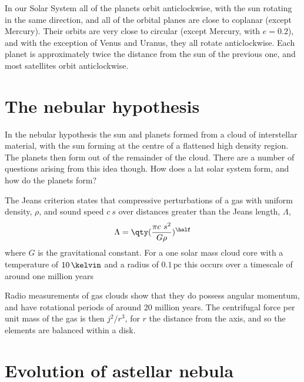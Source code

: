 In our Solar System all of the planets orbit anticlockwise, with the
sun rotating in the same direction, and all of the orbital planes are
close to coplanar (except Mercury). Their orbits are very close to
circular (except Mercury, with $e=0.2$), and with the exception of
Venus and Uranus, they all rotate anticlockwise. Each planet is
approximately twice the distance from the sun of the previous one, and
most satellites orbit anticlockwise.

\section{The nebular hypothesis}
\label{sec:nebular-hypothesis}

In the nebular hypothesis the sun and planets formed from a cloud of
interstellar material, with the sun forming at the centre of a
flattened high density region. The planets then form out of the
remainder of the cloud. There are a number of questions arising from
this idea though. How does a lat solar system form, and how do the
planets form?

The Jeans criterion states that compressive perturbations of a gas
with uniform density, $\rho$, and sound speed $c~s$ over distances
greater than the Jeans length, $\Lambda$,
\begin{equation}
  \label{eq:35}
  \Lambda = \qty( \frac{\pi c~s^2}{G \rho})^{\half}
\end{equation}
where $G$ is the gravitational constant. For a one solar mass cloud
core with a temperature of $10\,\kelvin$ and a radius of
$0.1\,\text{pc}$ this occurs over a timescale of around one million
years

Radio measurements of gas clouds show that they do possess angular
momentum, and have rotational periods of around 20 million years. The
centrifugal force per unit mass of the gas is then $j^2/r^3$, for $r$
the distance from the axis, and so the elements are balanced within a
disk.

\section{Evolution of  astellar nebula}
\label{sec:evol-astell-nebula}

